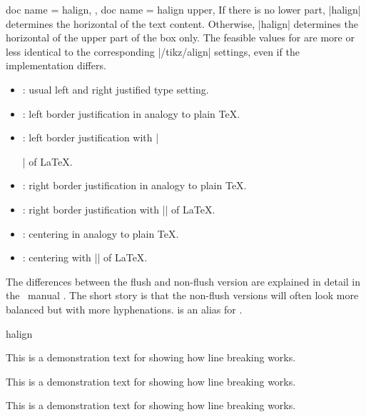\begin{docTcbKeys}[
    doc parameter   = {=\meta{alignment}},
    doc description = {no default, initially \texttt{justify}},
    doc new         = 2015-05-07,
  ]
  {
    {
      doc name = halign,
    },
    {
      doc name = halign upper,
    }
  }
  If there is no lower part, |halign| determines the horizontal 
  of the text content.
  Otherwise, |halign| determines the horizontal 
  of the upper part of the box only.
  The feasible values for  are more or less identical to
  the corresponding |/tikz/align| settings, even if the implementation differs.
  \begin{itemize}
  \item{}: usual left and right justified type setting.
  \item{}: left border justification in analogy to plain \TeX.
  \item{}: left border justification with |\raggedright| of \LaTeX.
  \item{}: right border justification in analogy to plain \TeX.
  \item{}: right border justification with |\raggedleft| of \LaTeX.
  \item{}: centering in analogy to plain \TeX.
  \item{}: centering with |\centering| of \LaTeX.
  \end{itemize}
  The differences between the flush and non-flush version are explained in
  detail in the \tikzname\ manual \cite{tantau:tikz_and_pgf}. The short story is that
  the non-flush versions will often look more balanced but with more
  hyphenations.
   is an alias for .

\begin{exdispExample}{halign}

\begin{tcolorbox}[adjusted title=flush center,halign=flush center]
This is a demonstration text for showing how line breaking works.
\end{tcolorbox}
\begin{tcolorbox}[adjusted title=flush left,halign=flush left]
This is a demonstration text for showing how line breaking works.
\end{tcolorbox}
\begin{tcolorbox}[adjusted title=flush right,halign=flush right]
This is a demonstration text for showing how line breaking works.
\end{tcolorbox}


\end{exdispExample}
\end{docTcbKeys}
